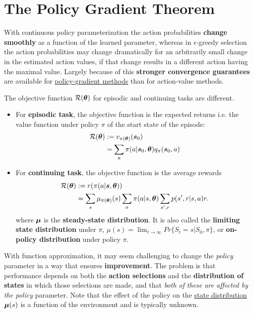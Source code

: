 \documentclass[11pt]{article}
\begin{document}
\section{The Policy Gradient Theorem}
With continuous policy parameterization the action probabilities \textbf{change smoothly} as a function of the learned parameter, whereas in $\epsilon$-greedy selection the action probabilities may change dramatically for an arbitrarily small change in the estimated action values, if that change results in a different action having the maximal value.  Largely because of this \textbf{stronger convergence guarantees} are available for \underline{policy-gradient methods} than for action-value methods.

The objective function ${\mathcal R}(\boldsymbol{\theta})$ for episodic and continuing tasks are different.
\begin{itemize}
\item For \textbf{episodic task}, the objective function is the expected returns i.e. the value function under policy $\pi$ of the start state of the episode:
\begin{align}
{\mathcal R}(\boldsymbol{\theta}) &:= v_{\pi( \boldsymbol{\theta})}(\boldsymbol{s}_{0})  \nonumber\\
&=\sum_{a}\pi(a |\boldsymbol{s}_{0}, \boldsymbol{\theta})q_{\pi}(\boldsymbol{s}_{0}, a)  \label{eqn: obj_policy_grad_episodic}
\end{align}

\item For \textbf{continuing task}, the objective function is the average rewards
\begin{align}
{\mathcal R}(\boldsymbol{\theta}) &:= r(\pi(a |\boldsymbol{s}, \boldsymbol{\theta}))  \nonumber \\
&= \sum_{s}\mu_{\pi(\boldsymbol{\theta})}(s)\sum_{a}\pi(a |s, \boldsymbol{\theta}) \sum_{s', r}p(s', r| s, a)r.  \label{eqn: obj_policy_grad_continuing}
\end{align} where $\boldsymbol{\mu}$ is the \textbf{steady-state distribution}. It is also called the \textbf{limiting state distribution} under $\pi$, $\mu(s) = \lim_{t\rightarrow \infty}Pr\{S_{t} = s| S_{0}, \pi\}$, or \textbf{on-policy distribution} under policy $\pi$.
\end{itemize}


With function approximation, it may seem challenging to change the \emph{policy} parameter in a way that ensures \textbf{improvement}. The problem is that performance depends on both the \textbf{action selections} and the \textbf{distribution of states} in which those selections are made, and that \emph{both of these are affected by the policy} parameter. Note that the effect of the policy on the \underline{state distribution} $\boldsymbol{\mu}(s)$ is a function of the environment and is typically unknown.
\end{document}
